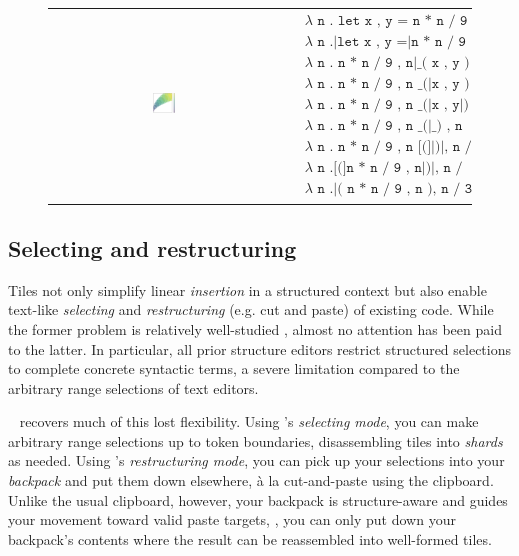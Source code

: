 \begin{figure}
  \begin{tabular}{cp{}}
  \includegraphics[width=0.1\textwidth]{img/circles-parabola-grow-2.png}
  &
  {
    \begin{align*}
      & \texttt{$\lambda$ n . let x , y = n * n / 9 , n|in ( x , y ) , n / 3} \\
      & \texttt{$\lambda$ n .|let x , y =|n * n / 9 , n[in] ( x , y ) , n / 3} \\
      & \texttt{$\lambda$ n . n * n / 9 , n|\_ ( x , y ) , n / 3} \\
      & \texttt{$\lambda$ n . n * n / 9 , n \_ (|x , y ) , n / 3} \\
      & \texttt{$\lambda$ n . n * n / 9 , n \_ (|x , y|) , n / 3} \\
      & \texttt{$\lambda$ n . n * n / 9 , n \_ (|\_ ) , n / 3} \\
      & \texttt{$\lambda$ n . n * n / 9 , n [(]|)|, n / 3} \\
      & \texttt{$\lambda$ n .[(]n * n / 9 , n|)|, n / 3} \\
      & \texttt{$\lambda$ n .|( n * n / 9 , n ), n / 3}
    \end{align*}
  }
  \end{tabular}
\end{figure}

\subsection{Selecting and restructuring}
Tiles not only simplify linear \emph{insertion} in a structured
context but also enable text-like \emph{selecting}
and \emph{restructuring} (e.g. cut and paste) of existing code.
While the former problem is relatively well-studied
,
almost no attention has been paid to the latter.
In particular, all prior structure editors restrict
structured selections to complete concrete syntactic terms,
a severe limitation compared to the arbitrary range
selections of text editors.

\tylr~ recovers much of this lost flexibility.
Using \tylr's \emph{selecting mode}, you can
make arbitrary range selections up to token boundaries,
disassembling tiles into \emph{shards} as needed.
Using \tylr's \emph{restructuring mode},
you can pick up your selections into your
\emph{backpack} and put them down elsewhere,
à la cut-and-paste using the clipboard.
Unlike the usual clipboard, however,
your backpack is structure-aware and guides your
movement toward valid paste targets, \ie,
you can only put down your backpack's contents
where the result can be reassembled into well-formed tiles.

